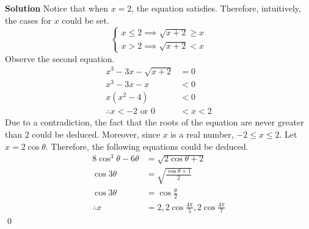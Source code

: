 \documentclass{article}
\newenvironment{solution}{\begin{trivlist}\item[]{\bf Solution}}{\qed \end{trivlist}}
\begin{document}
\begin{solution}
Notice that when $x = 2$, the equation satisfies.
Therefore, intuitively, the cases for $x$ could be set.
\[
\begin{cases}
    x \leq 2 \implies \sqrt{x + 2} \geq x \\
    x > 2 \implies \sqrt{x + 2} < x
\end{cases}
\]
Observe the second equation.
\begin{align*}
    x^3 - 3x - \sqrt{x + 2} &= 0 \\
    x^3 - 3x - x &< 0 \\
    x(x^2 - 4) &< 0 \\
    \therefore x < -2 \text{ or } 0 &< x < 2
\end{align*}
Due to a contradiction, the fact that the roots of the
equation are never greater than 2 could be deduced.
Moreover, since $x$ is a real number, $-2 \leq x \leq 2$.
Let $x = 2\cos\theta$. Therefore, the following equations
could be deduced.
\begin{align*}
    8\cos^3\theta - 6\theta &= \sqrt{2\cos\theta + 2} \\
    \cos3\theta &= \sqrt{\frac{\cos\theta + 1}{2}} \\
    \cos3\theta &= \cos\frac{\theta}{2} \\
    \therefore
    x &= \boxed{2, 2\cos\frac{4\pi}{5}, 2\cos\frac{4\pi}{7}}
\end{align*}
\end{solution}
\end{document}
